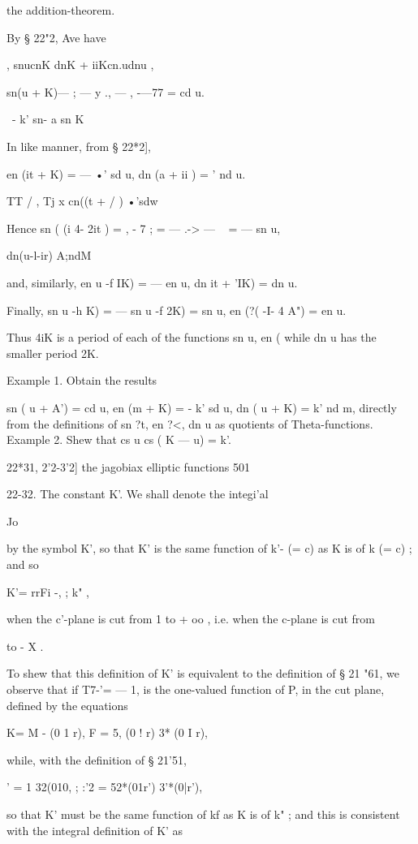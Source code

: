 the addition-theorem.

By § 22"2, Ave have

 , snucnK dnK + iiKcn.udnu ,

sn(u + K)— ; — y ., — , -—77 = cd u.

  \ - k' sn- a sn K

In like manner, from § 22*2],

en (it + K) = — •' sd u, dn (a + ii ) = ' nd u.

TT / , Tj x cn((t + / ) •'sdw

Hence sn ( (i 4- 2it ) = , - 7 ; = — .-> — ~ = — sn u,

  dn(u-l-ir) A;ndM

and, similarly, en u -f IK) = — en u, dn it + 'IK) = dn u.

Finally, sn u -h K) = — sn u -f 2K) = sn u, en (?( -I- 4 A") = en u.

Thus 4iK is a period of each of the functions sn u, en ( while dn u
has the smaller period 2K.

Example 1. Obtain the results

sn ( u + A') = cd u, en (m + K) = - k' sd u, dn ( u + K) = k' nd m,
directly from the definitions of sn ?t, en ?<, dn u as quotients of
Theta-functions. Example 2. Shew that cs u cs ( K — u) = k'.

22*31, 2'2-3'2] the jagobiax elliptic functions 501

22-32. The constant K'. We shall denote the integi'al

Jo

by the symbol K', so that K' is the same function of k'- (= c) as K is
of k (= c) ; and so

K'= rrFi -, ; k" ,

when the c'-plane is cut from 1 to + oo , i.e. when the c-plane is cut
from

to - X .

To shew that this definition of K' is equivalent to the definition of
§ 21 "61, we observe that if T7-'= — 1, is the one-valued function of
P, in the cut plane, defined by the equations

K= M - (0 1 r), F = 5, (0 ! r) 3* (0 I r),

while, with the definition of § 21'51,

 ' = 1 32(010, ; :'2 = 52*(01r') 3'*(0|r'),

so that K' must be the same function of kf as K is of k" ; and this is
consistent with the integral definition of K' as

